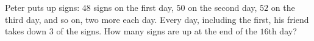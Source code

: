 Peter puts up signs: $48$ signs on the first day, $50$ on the second day, $52$ on the third day, and so on, two more each day. Every day, including the first, his friend takes down $3$ of the signs. How many signs are up at the end of the $16$th day?
